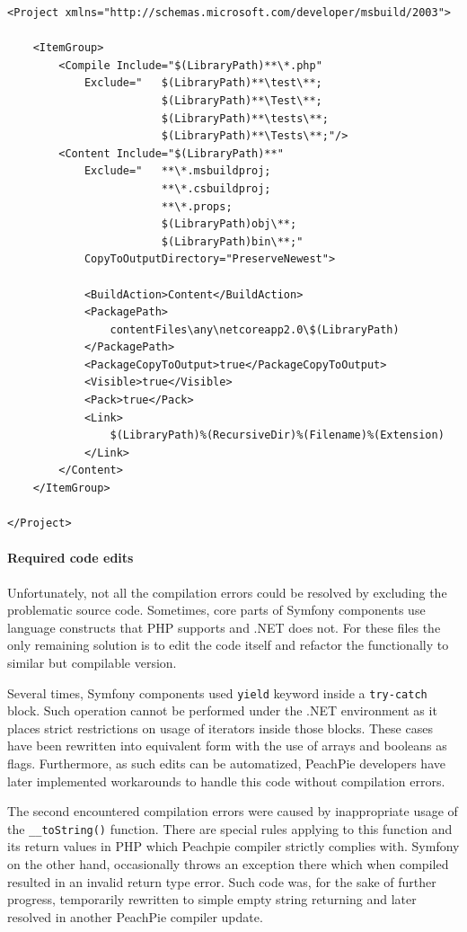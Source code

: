 \begin{center}
\begin{lstlisting}[caption={compilationConfig.props},captionpos=b]
<Project xmlns="http://schemas.microsoft.com/developer/msbuild/2003">

	<ItemGroup>
		<Compile Include="$(LibraryPath)**\*.php"
			Exclude="   $(LibraryPath)**\test\**;
				        $(LibraryPath)**\Test\**;
				        $(LibraryPath)**\tests\**;
				        $(LibraryPath)**\Tests\**;"/>
		<Content Include="$(LibraryPath)**"
			Exclude="   **\*.msbuildproj;
				        **\*.csbuildproj;
				        **\*.props;
				        $(LibraryPath)obj\**;
				        $(LibraryPath)bin\**;" 
			CopyToOutputDirectory="PreserveNewest">
			
			<BuildAction>Content</BuildAction>
			<PackagePath>
				contentFiles\any\netcoreapp2.0\$(LibraryPath)
			</PackagePath>
			<PackageCopyToOutput>true</PackageCopyToOutput>
			<Visible>true</Visible>
			<Pack>true</Pack>
			<Link>
				$(LibraryPath)%(RecursiveDir)%(Filename)%(Extension)
			</Link>
		</Content>
	</ItemGroup>
 
</Project>
\end{lstlisting}
\end{center}

\paragraph{Required code edits} Unfortunately, not all the compilation errors could be resolved by excluding the problematic source code. Sometimes, core parts of Symfony components use language constructs that PHP supports and .NET does not. For these files the only remaining solution is to edit the code itself and refactor the functionally to similar but compilable version.

Several times, Symfony components used \texttt{yield} keyword inside a \texttt{try-catch} block. Such operation cannot be performed under the .NET environment as it places strict restrictions on usage of iterators inside those blocks. These cases have been rewritten into equivalent form with the use of arrays and booleans as flags. Furthermore, as such edits can be automatized, PeachPie developers have later implemented workarounds to handle this code without compilation errors.

The second encountered compilation errors were caused by inappropriate usage of the \texttt{\_\_toString()} function. There are special rules applying to this function and its return values in PHP which Peachpie compiler strictly complies with. Symfony on the other hand, occasionally throws an exception there which when compiled resulted in an invalid return type error. Such code was, for the sake of further progress, temporarily rewritten to simple empty string returning and later resolved in another PeachPie compiler update.

